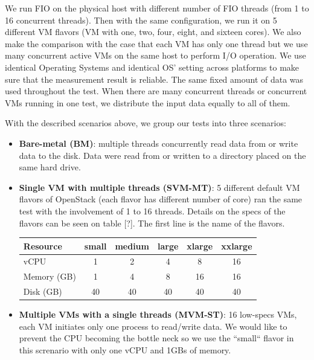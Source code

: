 \documentclass{acmsig}
\begin{document}
We run FIO on the physical host with different number of FIO threads (from 1 to 16 concurrent threads). Then with the same configuration, we run it on 5 different VM flavors (VM with one, two, four, eight, and sixteen cores). We also make the comparison with the case that each VM has only one thread but we use many concurrent active VMs on the same host to perform I/O operation. We use identical Operating Systems and identical OS' setting across platforms to make sure that the measurement result is reliable. The same fixed amount of data was used throughout the test. When there are many concurrent threads or concurrent VMs running in one test, we distribute the input data equally to all of them.

With the described scenarios above, we group our tests into three scenarios:
\begin{itemize}
  \item \textbf{Bare-metal (BM)}: multiple threads concurrently read data from or write data to the disk. Data were read from or written to a directory placed on the same hard drive.

  \item \textbf{Single VM with multiple threads (SVM-MT)}: 5 different default VM flavors of OpenStack (each flavor has different number of core) ran the same test with the involvement of 1 to 16 threads. Details on the specs of the flavors can be seen on table [?]. The first line is the name of the flavors.
      \begin{table}[h!]
      \begin{tabular}{|l|c|c|c|c|c|}
      \hline
      Resource & small & medium & large & xlarge & xxlarge \\
      \hline
      vCPU & 1 & 2 & 4 & 8 & 16 \\
      Memory (GB)& 1 & 4 & 8 & 16 & 16 \\
      Disk (GB)& 40 & 40 & 40 & 40 & 40 \\
      \hline
      \end{tabular}
      \end{table}
  \item \textbf{Multiple VMs with a single threads (MVM-ST)}: 16 low-specs VMs, each VM initiates only one process to read/write data. We would like to prevent the CPU becoming the bottle neck so we use the ``small`` flavor in this screnario with only one vCPU and 1GBs of memory.
\end{itemize}
\end{document}
